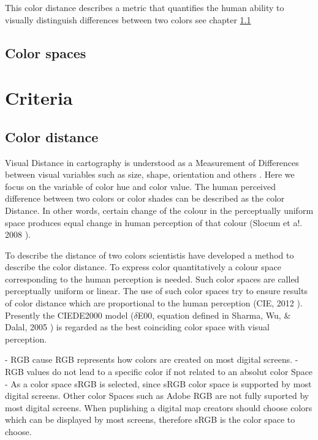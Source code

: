 This color distance describes a metric that quantifies the human ability to visually distinguish differences between two colors see chapter \ref{subsection:distance} \parencite{coltekin2017} 

\subsection{Color spaces}

\section{Criteria}

\subsection{Color distance}\label{subsection:distance}
Visual Distance in cartography is understood as a Measurement of Differences between visual variables such as size, shape, orientation and others \parencite{brychtova2015}. Here we focus on the variable of color hue and color value. The human perceived difference between two colors or color shades can be described as the color Distance. In other words, certain change of the colour in the perceptually uniform space produces equal change in human perception of that colour (Slocum et a!. 2008 \parencite{brychtova2017}).

To describe the distance of two colors scientistis have developed a method to describe the color distance. To express color quantitatively a colour space corresponding to the human perception is needed. Such color spaces are called perceptually uniform or linear. The use of such color spaces try to ensure results of color distance which are proportional to the human perception (CIE, 2012 \parencite{brychtova2015}). Presently the CIEDE2000 model ($\delta$E00, equation defined in Sharma, Wu, \& Dalal, 2005 \parencite{brychtova2015}) is regarded as the best coinciding color space with visual perception. 
 
- RGB cause RGB represents how colors are created on most digital screens. 
- RGB values do not lead to a specific color if not related to an absolut color Space
- As a color space sRGB is selected, since sRGB color space is supported by most digital screens. Other color Spaces such as Adobe RGB are not fully suported by most digital screens. When puplishing a digital map creators should choose colors which can be displayed by most screens, therefore sRGB is the color space to choose.
